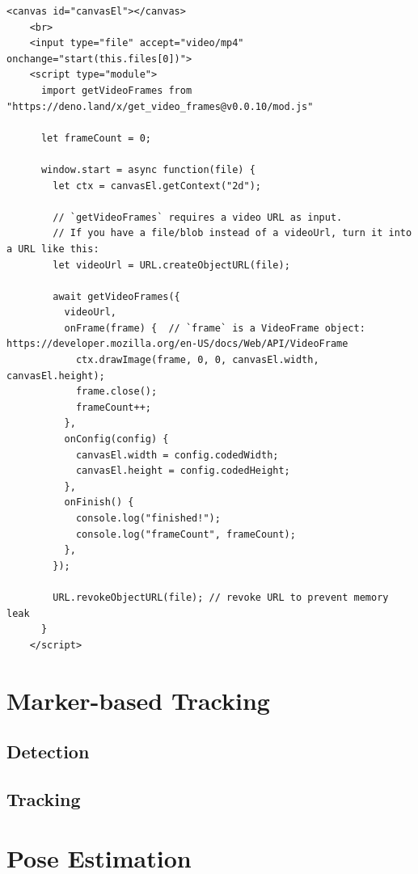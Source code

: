 \begin{lstlisting}[style=htmlcssjs, caption={Example usage of the getVideoFrames.js library. Taken from \url{https://github.com/josephrocca/getVideoFrames.js/}.}, label={getVideoFrames}]
    <canvas id="canvasEl"></canvas>
    <br>
    <input type="file" accept="video/mp4" onchange="start(this.files[0])">
    <script type="module">
      import getVideoFrames from "https://deno.land/x/get_video_frames@v0.0.10/mod.js"
      
      let frameCount = 0;
    
      window.start = async function(file) {
        let ctx = canvasEl.getContext("2d"); 
    
        // `getVideoFrames` requires a video URL as input.
        // If you have a file/blob instead of a videoUrl, turn it into a URL like this:
        let videoUrl = URL.createObjectURL(file);
    
        await getVideoFrames({
          videoUrl,
          onFrame(frame) {  // `frame` is a VideoFrame object: https://developer.mozilla.org/en-US/docs/Web/API/VideoFrame
            ctx.drawImage(frame, 0, 0, canvasEl.width, canvasEl.height);
            frame.close();
            frameCount++;
          },
          onConfig(config) {
            canvasEl.width = config.codedWidth;
            canvasEl.height = config.codedHeight;
          },
          onFinish() {
            console.log("finished!");
            console.log("frameCount", frameCount);
          },
        });
    
        URL.revokeObjectURL(file); // revoke URL to prevent memory leak
      }
    </script> 
\end{lstlisting}

\section{Marker-based Tracking}
\label{marker_based_tracking}

\subsection{Detection}

\subsection{Tracking}

\section{Pose Estimation}
\label{pose_estimation}


